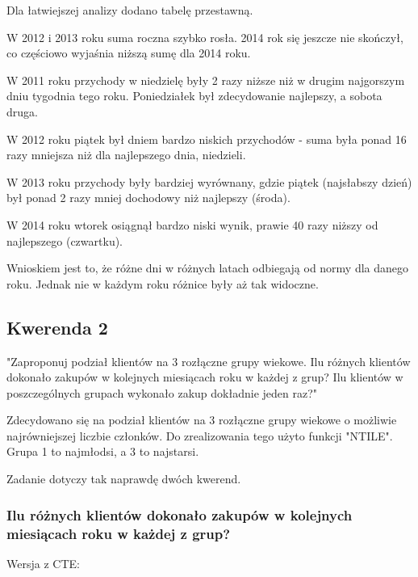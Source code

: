 \documentclass[a4paper,12pt]{article}
\begin{document}
Dla łatwiejszej analizy dodano tabelę przestawną.

W 2012 i 2013 roku suma roczna szybko rosła. 2014 rok się jeszcze nie skończył, co częściowo wyjaśnia niższą sumę dla 2014 roku.

W 2011 roku przychody w niedzielę były 2 razy niższe niż w drugim najgorszym dniu tygodnia tego roku. Poniedziałek był zdecydowanie najlepszy, a sobota druga.

W 2012 roku piątek był dniem bardzo niskich przychodów - suma była ponad 16 razy mniejsza niż dla najlepszego dnia, niedzieli.

W 2013 roku przychody były bardziej wyrównany, gdzie piątek (najsłabszy dzień) był ponad 2 razy mniej dochodowy niż najlepszy (środa).

W 2014 roku wtorek osiągnął bardzo niski wynik, prawie 40 razy niższy od najlepszego (czwartku).

Wnioskiem jest to, że różne dni w różnych latach odbiegają od normy dla danego roku. Jednak nie w każdym roku różnice były aż tak widoczne.

\subsection{Kwerenda 2}

"Zaproponuj podział klientów na 3 rozłączne grupy wiekowe. Ilu różnych klientów dokonało zakupów w kolejnych miesiącach roku w każdej z grup? Ilu klientów w poszczególnych grupach wykonało zakup dokładnie jeden raz?"

Zdecydowano się na podział klientów na 3 rozłączne grupy wiekowe o możliwie najrówniejszej liczbie członków. Do zrealizowania tego użyto funkcji "NTILE". Grupa 1 to najmłodsi, a 3 to najstarsi.

Zadanie dotyczy tak naprawdę dwóch kwerend.

\subsubsection{Ilu różnych klientów dokonało zakupów w kolejnych miesiącach roku w każdej z grup?}

Wersja z CTE:
\end{document}
